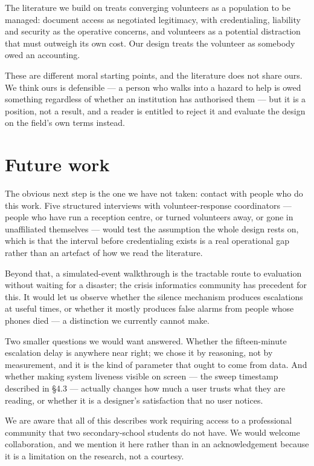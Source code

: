 The literature we build on treats converging volunteers as a population
to be managed: \citet{kendra2002} document access as negotiated
legitimacy, with credentialing, liability and security as the operative
concerns, and volunteers as a potential distraction that must outweigh
its own cost. Our design treats the volunteer as somebody owed an
accounting.

These are different moral starting points, and the literature does not
share ours. We think ours is defensible --- a person who walks into a
hazard to help is owed something regardless of whether an institution
has authorised them --- but it is a position, not a result, and a reader
is entitled to reject it and evaluate the design on the field's own
terms instead.

\section{Future work}

The obvious next step is the one we have not taken: contact with people
who do this work. Five structured interviews with volunteer-response
coordinators --- people who have run a reception centre, or turned
volunteers away, or gone in unaffiliated themselves --- would test the
assumption the whole design rests on, which is that the interval before
credentialing exists is a real operational gap rather than an artefact
of how we read the literature.

Beyond that, a simulated-event walkthrough is the tractable route to
evaluation without waiting for a disaster; the crisis informatics
community has precedent for this. It would let us observe whether the
silence mechanism produces escalations at useful times, or whether it
mostly produces false alarms from people whose phones died --- a
distinction we currently cannot make.

Two smaller questions we would want answered. Whether the fifteen-minute
escalation delay is anywhere near right; we chose it by reasoning, not
by measurement, and it is the kind of parameter that ought to come from
data. And whether making system liveness visible on screen --- the sweep
timestamp described in §4.3 --- actually changes how much a user trusts
what they are reading, or whether it is a designer's satisfaction that
no user notices.

We are aware that all of this describes work requiring access to a
professional community that two secondary-school students do not have.
We would welcome collaboration, and we mention it here rather than in an
acknowledgement because it is a limitation on the research, not a
courtesy.

